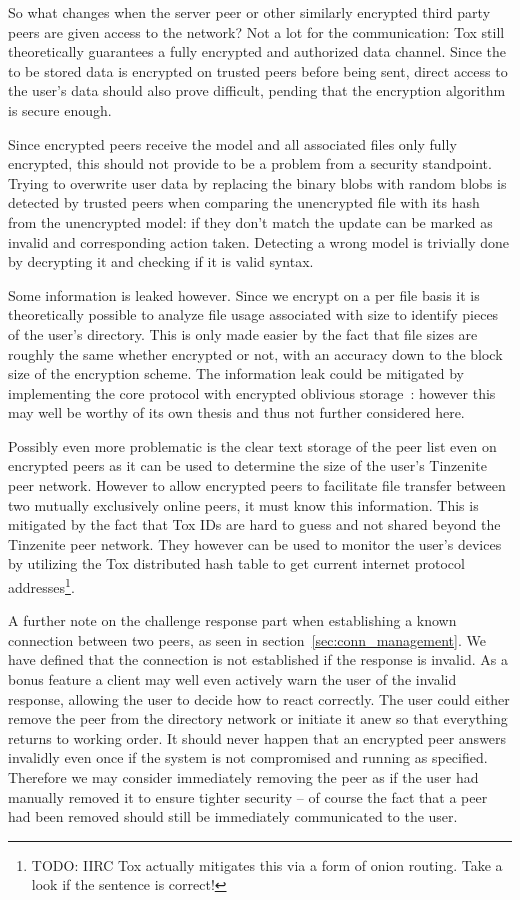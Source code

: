 So what changes when the server peer or other similarly encrypted third party peers are given access to the network?
Not a lot for the communication: Tox still theoretically guarantees a fully encrypted and authorized data channel.
Since the to be stored data is encrypted on trusted peers before being sent, direct access to the user's data should also prove difficult, pending that the encryption algorithm is secure enough.

Since encrypted peers receive the model and all associated files only fully encrypted, this should not provide to be a problem from a security standpoint.
Trying to overwrite user data by replacing the binary blobs with random blobs is detected by trusted peers when comparing the unencrypted file with its hash from the unencrypted model: if they don't match the update can be marked as invalid and corresponding action taken.
Detecting a wrong model is trivially done by decrypting it and checking if it is valid syntax.

Some information is leaked however.
Since we encrypt on a per file basis it is theoretically possible to analyze file usage associated with size to identify pieces of the user's directory.
This is only made easier by the fact that file sizes are roughly the same whether encrypted or not, with an accuracy down to the block size of the encryption scheme.
The information leak could be mitigated by implementing the core protocol with encrypted oblivious storage~\cite{goldreich1987towards}: however this may well be worthy of its own thesis and thus not further considered here.


Possibly even more problematic is the clear text storage of the peer list even on encrypted peers as it can be used to determine the size of the user's Tinzenite peer network.
However to allow encrypted peers to facilitate file transfer between two mutually exclusively online peers, it must know this information.
This is mitigated by the fact that Tox IDs are hard to guess and not shared beyond the Tinzenite peer network.
They however can be used to monitor the user's devices by utilizing the Tox distributed hash table to get current internet protocol addresses\footnote{TODO: IIRC Tox actually mitigates this via a form of onion routing. Take a look if the sentence is correct!}.

A further note on the challenge response part when establishing a known connection between two peers, as seen in section~\ref{sec:conn_management}.
We have defined that the connection is not established if the response is invalid.
As a bonus feature a client may well even actively warn the user of the invalid response, allowing the user to decide how to react correctly.
The user could either remove the peer from the directory network or initiate it anew so that everything returns to working order.
It should never happen that an encrypted peer answers invalidly even once if the system is not compromised and running as specified.
Therefore we may consider immediately removing the peer as if the user had manually removed it to ensure tighter security – of course the fact that a peer had been removed should still be immediately communicated to the user.

